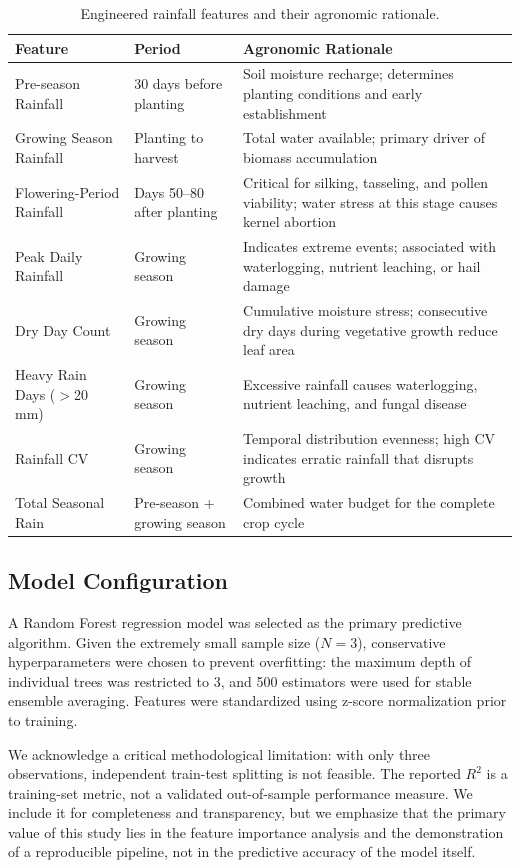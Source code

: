 \documentclass[11pt,a4paper]{article}
\begin{document}
\begin{table}[htbp]
\centering
\caption{Engineered rainfall features and their agronomic rationale.}
\label{tab:features}
\small
\begin{tabular}{llp{6.5cm}}
\toprule
\textbf{Feature} & \textbf{Period} & \textbf{Agronomic Rationale} \\
\midrule
Pre-season Rainfall & 30 days before planting & Soil moisture recharge; determines planting conditions and early establishment \\
Growing Season Rainfall & Planting to harvest & Total water available; primary driver of biomass accumulation \\
Flowering-Period Rainfall & Days 50--80 after planting & Critical for silking, tasseling, and pollen viability; water stress at this stage causes kernel abortion \\
Peak Daily Rainfall & Growing season & Indicates extreme events; associated with waterlogging, nutrient leaching, or hail damage \\
Dry Day Count & Growing season & Cumulative moisture stress; consecutive dry days during vegetative growth reduce leaf area \\
Heavy Rain Days ($>$20 mm) & Growing season & Excessive rainfall causes waterlogging, nutrient leaching, and fungal disease \\
Rainfall CV & Growing season & Temporal distribution evenness; high CV indicates erratic rainfall that disrupts growth \\
Total Seasonal Rain & Pre-season + growing season & Combined water budget for the complete crop cycle \\
\bottomrule
\end{tabular}
\end{table}

\subsection{Model Configuration}

A Random Forest regression model was selected as the primary predictive algorithm. Given the extremely small sample size ($N = 3$), conservative hyperparameters were chosen to prevent overfitting: the maximum depth of individual trees was restricted to 3, and 500 estimators were used for stable ensemble averaging. Features were standardized using z-score normalization prior to training.

We acknowledge a critical methodological limitation: with only three observations, independent train-test splitting is not feasible. The reported $R^2$ is a training-set metric, not a validated out-of-sample performance measure. We include it for completeness and transparency, but we emphasize that the primary value of this study lies in the feature importance analysis and the demonstration of a reproducible pipeline, not in the predictive accuracy of the model itself.
\end{document}
